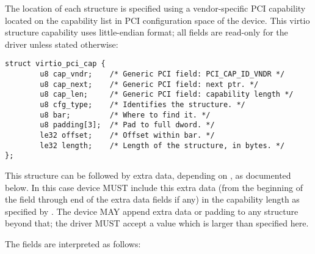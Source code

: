 The location of each structure is specified using a vendor-specific PCI capability located
on the capability list in PCI configuration space of the device.
This virtio structure capability uses little-endian format; all fields are
read-only for the driver unless stated otherwise:

\begin{lstlisting}
struct virtio_pci_cap {
        u8 cap_vndr;    /* Generic PCI field: PCI_CAP_ID_VNDR */
        u8 cap_next;    /* Generic PCI field: next ptr. */
        u8 cap_len;     /* Generic PCI field: capability length */
        u8 cfg_type;    /* Identifies the structure. */
        u8 bar;         /* Where to find it. */
        u8 padding[3];  /* Pad to full dword. */
        le32 offset;    /* Offset within bar. */
        le32 length;    /* Length of the structure, in bytes. */
};
\end{lstlisting}

This structure can be followed by extra data, depending on
, as documented below.  In this case device MUST include
this extra data (from the beginning of the  field
through end of the extra data fields if any)
in the capability length as specified by .
The device MAY append extra data
or padding to any structure beyond that; the driver MUST accept a  value
which is larger than specified here.

The fields are interpreted as follows:

